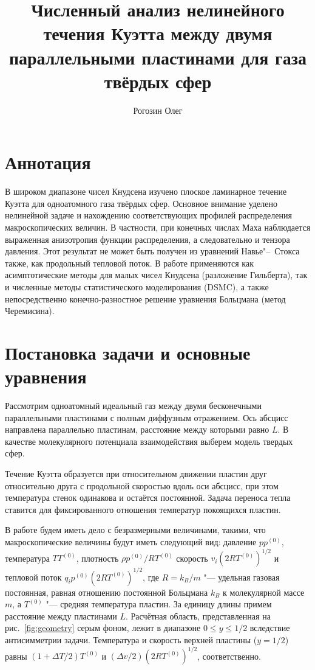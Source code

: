 \documentclass[a4paper,12pt]{article}
\title{Численный анализ нелинейного течения Куэтта между двумя параллельными пластинами для газа твёрдых сфер}
\author{Рогозин Олег}
\begin{document}
\maketitle
\tableofcontents

\section{Аннотация}

В широком диапазоне чисел Кнудсена изучено плоское ламинарное течение Куэтта для одноатомного газа твёрдых сфер.
Основное внимание уделено нелинейной задаче и нахождению соответствующих профилей распределения макроскопических величин.
В частности, при конечных числах Маха наблюдается выраженная анизотропия функции распределения,
а следовательно и тензора давления. Этот результат не может быть получен из уравнений Навье"--~Стокса также,
как продольный тепловой поток.
В работе применяются как асимптотические методы для малых чисел Кнудсена (разложение Гильберта),
так и численные методы статистического моделирования (DSMC),
а также непосредственно конечно-разностное решение уравнения Больцмана (метод Черемисина).

\section{Постановка задачи и основные уравнения}

Рассмотрим одноатомный идеальный газ между двумя бесконечными параллельными пластинами с полным диффузным отражением.
Ось абсцисс направлена параллельно пластинам, расстояние между которыми равно \(L\).
В качестве молекулярного потенциала взаимодействия выберем модель твердых сфер.

Течение Куэтта образуется при относительном движении пластин друг относительно друга с продольной скоростью
вдоль оси абсцисс, при этом температура стенок одинакова и остаётся постоянной.
Задача переноса тепла ставится для фиксированного отношения температур покоящихся пластин.

В работе будем иметь дело с безразмерными величинами, такими, что макроскопические величины будут
иметь следующий вид: давление \(pp^{(0)}\), температура \(TT^{(0)}\), плотность \(\rho p^{(0)}/RT^{(0)}\)
скорость \(v_i(2RT^{(0)})^{1/2}\) и тепловой поток \(q_ip^{(0)}(2RT^{(0)})^{1/2}\),
где \(R = k_B/m\) "--- удельная газовая постоянная,
равная отношению постоянной Больцмана \(k_B\) к молекулярной массе \(m\),
а \(T^{(0)}\) "--- средняя температура пластин.
За единицу длины примем расстояние между пластинами \(L\).
Расчётная область, представленная на рис.~\ref{fig:geometry} серым фоном,
лежит в диапазоне \(0 \le y\le 1/2\) вследствие антисимметрии задачи.
Температура и скорость верхней пластины (\(y=1/2\)) равны \((1+\Delta{T}/2)T^{(0)}\)
и \((\Delta{v}/2)(2RT^{(0)})^{1/2}\), соответственно.
\end{document}
